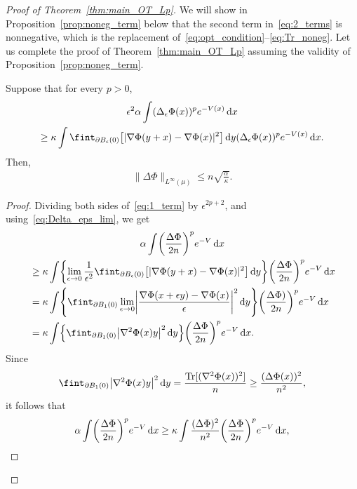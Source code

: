 \documentclass[AHL,Unicode,longabstracts]{cedram}
\DeclareMathOperator{\Tr}{Tr}
\newcommand{\dd}{n}
\newcommand{\source}{\mu}
\newcommand{\lsh}{\alpha}
\newcommand{\lc}{\kappa}
\newcommand*\diff{\mathop{}\!\mathrm{d}}
\newcommand{\OT}{\Phi}
\newcommand{\avgint}{\fint}
\renewcommand*{\to}{\mathchoice{\longrightarrow}{\rightarrow}{\rightarrow}{\rightarrow}}
\let\originalleft\left
\let\originalright\right
\renewcommand{\left}{\mathopen{}\mathclose\bgroup\originalleft}
\renewcommand{\right}{\aftergroup\egroup\originalright}
\begin{document}
\begin{proof}[Proof of Theorem~\ref{thm:main_OT_Lp}]
We will show in Proposition~\ref{prop:noneg_term} below that the second term in~\eqref{eq:2_terms} is nonnegative, which is the replacement of~\eqref{eq:opt_condition}--\eqref{eq:Tr_noneg}. Let us complete the proof of Theorem~\ref{thm:main_OT_Lp} assuming the validity of Proposition~\ref{prop:noneg_term}.
\begin{lemm}\label{lem:_term_to_thm_proof}
Suppose that for every $p>0$,
\begin{multline}\label{eq:1_term}
\epsilon^2 \lsh\int (\Delta_{\epsilon}\OT(x))^p e^{-V(x)}\diff x\\
\ge \lc\int\avgint_{\partial B_{\epsilon}(0)}\left[|\nabla\OT(y+x)-\nabla\OT(x)|^2 \right]\diff y(\Delta_{\epsilon}\OT(x))^p e^{-V(x)}\diff x.
\end{multline}
Then,
\begin{align}\label{eq:infty_bound}
\|\Delta\OT\|_{L^{\infty}(\source)}\le \dd\sqrt{ \frac{\lsh}{\lc}}.
\end{align}
\end{lemm}
\begin{proof}
Dividing both sides of~\eqref{eq:1_term} by $\epsilon^{2p+2}$, and using~\eqref{eq:Delta_eps_lim}, we get
\begin{multline*}
\lsh \int \left(\frac{\Delta \OT}{2\dd}\right)^p e^{-V}\diff x\\
\begin{aligned}
&\ge \lc \int\left\{\lim_{\epsilon\to 0}\frac{1}{\epsilon^2}\avgint_{\partial B_{\epsilon}(0)}\left[|\nabla\OT(y+x)-\nabla\OT(x)|^2 \right]\diff y\right\} \left(\frac{\Delta \OT}{2\dd}\right)^p e^{-V}\diff x\\
&=\lc \int\left\{\avgint_{\partial B_{1}(0)}\lim_{\epsilon\to 0}\left|\frac{\nabla\OT(x+\epsilon y)-\nabla\OT(x)}{\epsilon}\right|^2\diff y\right\} \left(\frac{\Delta \OT)}{2\dd}\right)^p e^{-V}\diff x\\
&=\lc \int\left\{\avgint_{\partial B_{1}(0)}\left| \nabla^2\OT(x)y\right|^2\diff y\right\} \left(\frac{\Delta \OT}{2\dd}\right)^p e^{-V}\diff x.
\end{aligned}
\end{multline*}
Since
\begin{align*}
\avgint_{\partial B_{1}(0)}\left| \nabla^2\OT(x)y\right|^2\diff y=\frac{\Tr[(\nabla^2\OT(x))^2]}{
\dd}\ge \frac{(\Delta \OT(x))^2}{\dd^2},
\end{align*}
it follows that
\[
\lsh\int \left(\frac{\Delta \OT}{2\dd}\right)^p e^{-V}\diff x\ge \lc \int \frac{(\Delta \OT)^2}{\dd^2} \left(\frac{\Delta \OT}{2\dd}\right)^p e^{-V}\diff x,
\]
\end{proof}
\end{proof}
\end{document}
